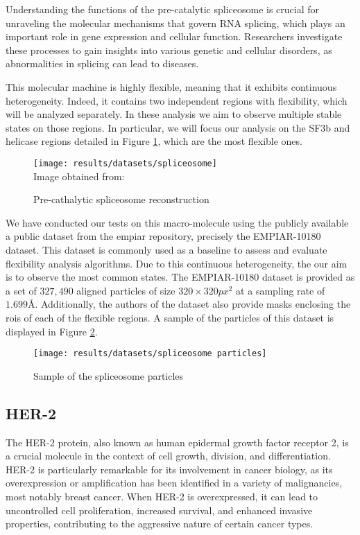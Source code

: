 \documentclass[../main.tex]{subfiles}
\begin{document}
Understanding the functions of the pre-catalytic spliceosome is crucial for unraveling the molecular mechanisms that govern RNA splicing, which plays an important role in gene expression and cellular function. Researchers investigate these processes to gain insights into various genetic and cellular disorders, as abnormalities in splicing can lead to diseases.

This molecular machine is highly flexible, meaning that it exhibits continuous heterogeneity. Indeed, it contains two independent regions with flexibility, which will be analyzed separately. In these analysis we aim to observe multiple stable states on those regions. In particular, we will focus our analysis on the SF3b and helicase regions detailed in Figure \ref{fig:5.1:spliceosome}, which are the most flexible ones. 

\begin{figure}[htbp]
    \centering
    \texttt{[image: results/datasets/spliceosome]}\\
    Image obtained from: \cite{nakane2021}
    \caption{Pre-cathalytic spliceosome reconstruction}
    \label{fig:5.1:spliceosome}
\end{figure}

We have conducted our tests on this macro-molecule using the publicly available a public dataset from the \gls{empiar} repository, precisely the EMPIAR-10180\cite{empiar10180} dataset. This dataset is commonly used as a baseline to assess and evaluate flexibility analysis algorithms\cite{herreros2021}\cite{nakane2021}\cite{herreros2023}. Due to this continuous heterogeneity, the our aim is to observe the most common states. The EMPIAR-10180 dataset is provided as a set of $327,490$ aligned particles of size $320 \times 320 \si{px^2}$ at a sampling rate of $1.699 \si{\angstrom}$. Additionally, the authors of the dataset also provide masks enclosing the \glspl{roi} of each of the flexible regions. A sample of the particles of this dataset is displayed in Figure \ref{fig:5.1:spliceosome_particles}.

\begin{figure}[htbp]
    \centering
    \texttt{[image: results/datasets/spliceosome particles]}
    \caption{Sample of the spliceosome particles}
    \label{fig:5.1:spliceosome_particles}
\end{figure}

\subsection{HER-2}
The HER-2 protein, also known as human epidermal growth factor receptor 2, is a crucial molecule in the context of cell growth, division, and differentiation. HER-2 is particularly remarkable for its involvement in cancer biology, as its overexpression or amplification has been identified in a variety of malignancies, most notably breast cancer. When HER-2 is overexpressed, it can lead to uncontrolled cell proliferation, increased survival, and enhanced invasive properties, contributing to the aggressive nature of certain cancer types.
\end{document}
